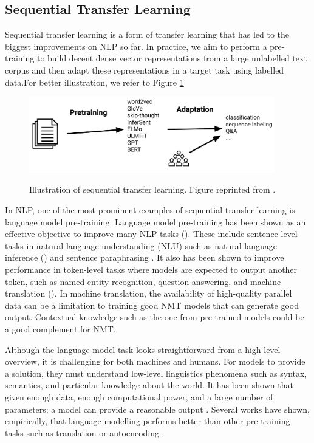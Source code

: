 \subsection{Sequential Transfer Learning}
Sequential transfer learning is a form of transfer learning that has led to the biggest improvements on NLP so far. In practice, we aim to perform a pre-training to build decent dense vector representations from a large unlabelled text corpus and then adapt these representations in a target task using labelled data.For better illustration, we refer to Figure \ref{img:seq_tl}

\begin{figure}[h]
    {\includegraphics[width=0.95\textwidth]{img/sequential_tl.png}}
    \centering
    \caption{Illustration of sequential transfer learning. Figure reprinted from \cite{ruder2019transfer}.}
    \label{img:seq_tl}
\end{figure}

In NLP, one of the most prominent examples of sequential transfer learning is language model pre-training. Language model pre-training has been shown as an effective objective to improve many NLP tasks (\cite{Dai2015SemisupervisedSL,Peters2018DeepCW,Radford2018ImprovingLU,Howard2018UniversalLM}). These include sentence-level tasks in natural language understanding (NLU) such as natural language inference (\cite{Bowman2015ALA,Williams2018ABC}) and sentence paraphrasing \cite{Dolan2005AutomaticallyCA}. It also has been shown to improve performance in token-level tasks where models are expected to output another token, such as named entity recognition, question answering, and machine translation (\cite{Sang2003IntroductionTT,Rajpurkar2016SQuAD1Q}). In machine translation, the availability of high-quality parallel data can be a limitation to training good NMT models that can generate good output. Contextual knowledge such as the one from pre-trained models could be a good complement for NMT.

Although the language model task looks straightforward from a high-level overview, it is challenging for both machines and humans. For models to provide a solution, they must understand low-level linguistics phenomena such as syntax, semantics, and particular knowledge about the world. It has been shown that given enough data, enough computational power, and a large number of parameters; a model can provide a reasonable output \cite{radford2018improving}. Several works have shown, empirically, that language modelling performs better than other pre-training tasks such as translation or autoencoding \cite{Zhang2018LanguageMT,Wang2019CanYT}.

